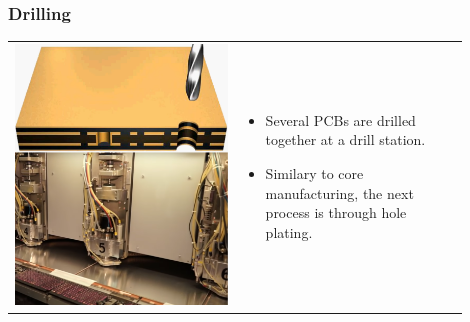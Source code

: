 \documentclass{beamer}
\begin{document}
	\begin{frame}
    \frametitle{Drilling}

		\begin{center}
			\begin{tabular}{m{0.45\linewidth} m{0.45\linewidth}}
			 \includegraphics[scale=0.15]{obr12_vnejsiVrtani.png} &
				
				\begin{itemize}
					\item Several PCBs are drilled together at a drill station.
					\item Similary to core manufacturing, the next process is through hole plating.
				\end{itemize}
			\end{tabular}
		\end{center}
	\end{frame}
\end{document}
